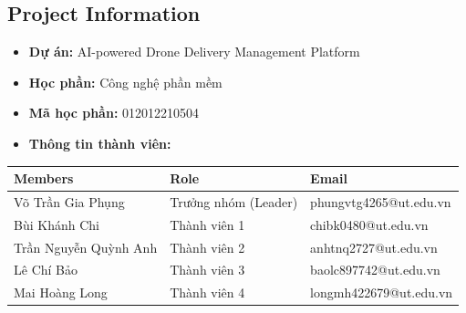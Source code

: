\subsection{Project Information}

\begin{itemize}
  \item \textbf{Dự án:} AI-powered Drone Delivery Management Platform
  \item \textbf{Học phần:} Công nghệ phần mềm
  \item \textbf{Mã học phần:} 012012210504
  \item \textbf{Thông tin thành viên:}
\end{itemize}

\begin{longtable}{@{}lll@{}}
\toprule
\textbf{Members} & \textbf{Role} & \textbf{Email} \\
\midrule
\endhead
Võ Trần Gia Phụng & Trưởng nhóm (Leader) & phungvtg4265@ut.edu.vn \\
Bùi Khánh Chi & Thành viên 1 & chibk0480@ut.edu.vn \\
Trần Nguyễn Quỳnh Anh & Thành viên 2 & anhtnq2727@ut.edu.vn \\
Lê Chí Bảo & Thành viên 3 & baolc897742@ut.edu.vn \\
Mai Hoàng Long & Thành viên 4 & longmh422679@ut.edu.vn \\
\bottomrule
\end{longtable}
